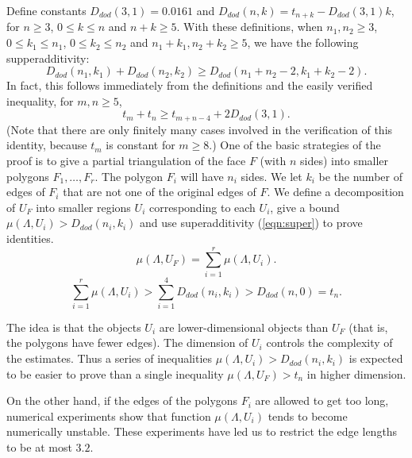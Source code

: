 Define constants $D_{dod}(3,1) = 0.0161$ and $D_{dod}(n,k) = t_{n+k} - D_{dod}(3,1)k$,
for $n\ge 3$, $0\le k\le n$ and $n+k\ge 5$.  With these definitions,
when $n_1,n_2\ge 3$, $0\le k_1\le n_1$, $0\le k_2\le n_2$ and $n_1+k_1,n_2+k_2\ge 5$, we have the following supperadditivity:
\begin{equation}\label{eqn:super}
  D_{dod}(n_1,k_1) + D_{dod}(n_2,k_2) \ge D_{dod}(n_1+n_2-2,k_1+k_2-2).
\end{equation}
In fact, this follows immediately from the definitions and the
easily verified inequality,
for $m,n\ge 5$,
$$
t_m + t_n \ge t_{m+n-4} + 2 D_{dod}(3,1).
$$
(Note that there are only finitely many cases involved in the
verification of this identity,
because $t_m$ is constant for $m\ge 8$.)
One of the basic strategies of the proof is to give a partial triangulation
of the face $F$ (with $n$ sides)
into smaller polygons $F_1,\ldots,F_r$.  The polygon
$F_i$ will have $n_i$ sides.  We let $k_i$ be the number of edges
of $F_i$ that are not one of the original edges of $F$.  We define
a decomposition of $U_F$ into smaller regions $U_i$ corresponding
to each $U_i$, give a bound $\mu(\Lambda,U_i) > D_{dod}(n_i,k_i)$
and use superadditivity (\ref{eqn:super}) to prove identities.
\begin{equation}\label{eqn:mu}
  \mu(\Lambda,U_F) = \sum_{i=1}^r \mu(\Lambda,U_i).
\end{equation}
\begin{equation}\label{eqn:super-mu}
\sum_{i=1}^r \mu(\Lambda,U_i) > \sum_{i=1}^4 D_{dod}(n_i,k_i)
 > D_{dod}(n,0) = t_n.
\end{equation}

The idea is that the objects $U_i$ are lower-dimensional objects
than $U_F$ (that is, the polygons  have fewer edges).
The dimension of $U_i$ controls the complexity
of the estimates.  Thus a series of inequalities $\mu(\Lambda,U_i) > D_{dod}(n_i,k_i)$
is expected to be easier to prove than a single inequality
$\mu(\Lambda,U_F) > t_n$ in higher dimension.  

On the other hand, if the edges of the polygons $F_i$ are allowed
to get too long, numerical experiments show that function $\mu(\Lambda,U_i)$
tends to become numerically unstable.  These experiments have led
us to restrict the edge lengths to be at most $3.2$.

